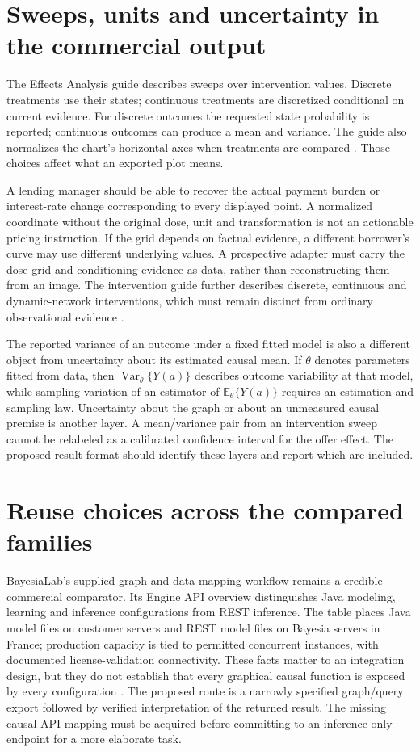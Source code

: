 \section{Sweeps, units and uncertainty in the commercial output}

The Effects Analysis guide describes sweeps over intervention values. Discrete
treatments use their states; continuous treatments are discretized conditional
on current evidence. For discrete outcomes the requested state probability is
reported; continuous outcomes can produce a mean and variance. The guide also
normalizes the chart's horizontal axes when treatments are compared
\citep{exec14_ci_effects}. Those choices affect what an exported plot means.

A lending manager should be able to recover the actual payment burden or
interest-rate change corresponding to every displayed point. A normalized
coordinate without the original dose, unit and transformation is not an
actionable pricing instruction. If the grid depends on factual evidence, a
different borrower's curve may use different underlying values. A prospective
adapter must carry the dose grid and conditioning evidence as data, rather
than reconstructing them from an image. The intervention guide further
describes discrete, continuous and dynamic-network interventions, which must
remain distinct from ordinary observational evidence
\citep{exec14_ci_interventions}.

The reported variance of an outcome under a fixed fitted model is also a
different object from uncertainty about its estimated causal mean. If
$\theta$ denotes parameters fitted from data, then
$\operatorname{Var}_{\theta}\{Y(a)\}$ describes outcome variability at
that model, while sampling variation of an estimator of
$\mathbb E_{\theta}\{Y(a)\}$ requires an estimation and sampling law.
Uncertainty about the graph or about an unmeasured causal premise is another
layer. A mean/variance pair from an intervention sweep cannot be relabeled as
a calibrated confidence interval for the offer effect. The proposed result
format should identify these layers and report which are included.

\section{Reuse choices across the compared families}

BayesiaLab's supplied-graph and data-mapping workflow remains a credible
commercial comparator. Its Engine API overview distinguishes Java modeling,
learning and inference configurations from REST inference. The table places
Java model files on customer servers and REST model files on Bayesia servers
in France; production capacity is tied to permitted concurrent instances,
with documented license-validation connectivity. These facts matter to an
integration design, but they do not establish that every graphical causal
function is exposed by every configuration
\citep{exec13_bayesia_api,exec13_bayesia_professional}. The proposed route is
a narrowly specified graph/query export followed by verified interpretation
of the returned result. The missing causal API mapping must be acquired before
committing to an inference-only endpoint for a more elaborate task.

